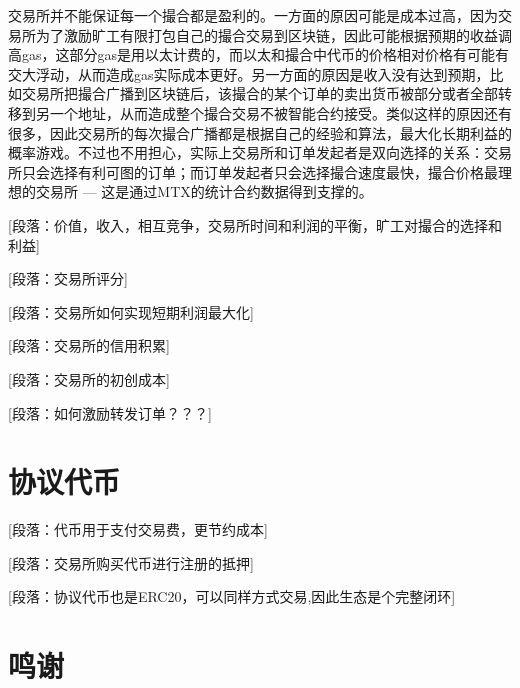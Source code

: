 \documentclass[UTF8,nofonts]{ctexart}
\begin{document}
交易所并不能保证每一个撮合都是盈利的。一方面的原因可能是成本过高，因为交易所为了激励旷工有限打包自己的撮合交易到区块链，因此可能根据预期的收益调高gas，这部分gas是用以太计费的，而以太和撮合中代币的价格相对价格有可能有交大浮动，从而造成gas实际成本更好。另一方面的原因是收入没有达到预期，比如交易所把撮合广播到区块链后，该撮合的某个订单的卖出货币被部分或者全部转移到另一个地址，从而造成整个撮合交易不被智能合约接受。类似这样的原因还有很多，因此交易所的每次撮合广播都是根据自己的经验和算法，最大化长期利益的概率游戏。不过也不用担心，实际上交易所和订单发起者是双向选择的关系：交易所只会选择有利可图的订单；而订单发起者只会选择撮合速度最快，撮合价格最理想的交易所 --- 这是通过MTX的统计合约数据得到支撑的。

[段落：价值，收入，相互竞争，交易所时间和利润的平衡，旷工对撮合的选择和利益]

[段落：交易所评分]

[段落：交易所如何实现短期利润最大化]

[段落：交易所的信用积累]

[段落：交易所的初创成本]


[段落：如何激励转发订单？？？]

\section{协议代币\label{sec:exchangetoken}}

[段落：代币用于支付交易费，更节约成本]

[段落：交易所购买代币进行注册的抵押]

[段落：协议代币也是ERC20，可以同样方式交易,因此生态是个完整闭环]

\section{鸣谢\label{sec:acknowledgement}}



\end{document}
